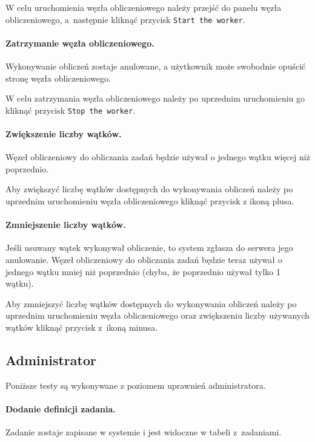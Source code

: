 \documentclass[a4paper,11pt,twoside]{report}
\theoremstyle{definition}
\begin{document}
                W celu uruchomienia węzła obliczeniowego należy przejść do panelu węzła obliczeniowego, a~następnie kliknąć przycisk \texttt{Start the worker}. 
                
            \paragraph{Zatrzymanie węzła obliczeniowego.}  
                \noindent Wykonywanie obliczeń zostaje anulowane, a użytkownik może swobodnie opuścić stronę węzła obliczeniowego.
    
                W celu zatrzymania węzła obliczeniowego należy po uprzednim uruchomieniu go kliknąć przycisk \texttt{Stop the worker}.
                
            \paragraph{Zwiększenie liczby wątków.}   
                \noindent Węzeł obliczeniowy do obliczania zadań będzie używał o jednego wątku więcej niż poprzednio. 

                Aby zwiększyć liczbę wątków dostępnych do wykonywania obliczeń należy po uprzednim uruchomieniu węzła obliczeniowego kliknąć przycisk z ikoną plusa.

            \paragraph{Zmniejszenie liczby wątków.}   
                \noindent Jeśli usuwany wątek wykonywał obliczenie, to system zgłasza do serwera jego anulowanie. Węzeł obliczeniowy do obliczania zadań będzie teraz używał o jednego wątku mniej niż poprzednio (chyba, że poprzednio używał tylko 1 wątku).

                Aby zmniejszyć liczbę wątków dostępnych do wykonywania obliczeń należy po uprzednim uruchomieniu węzła obliczeniowego oraz zwiększeniu liczby używanych wątków kliknąć przycisk z~ikoną minusa.

        \subsection{Administrator}
            Poniższe testy są wykonywane z poziomem uprawnień administratora.

            \paragraph{Dodanie definicji zadania.}   
                \noindent Zadanie zostaje zapisane w systemie i jest widoczne w tabeli z~zadaniami. 
\end{document}
